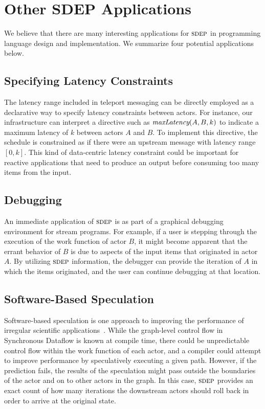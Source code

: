 \section{Other SDEP Applications}

We believe that there are many interesting applications for $\textsc{sdep}$ in
programming language design and implementation.  We summarize four
potential applications below.

\subsection{Specifying Latency Constraints}

The latency range included in teleport messaging can be directly
employed as a declarative way to specify latency constraints between
actors.  For instance, our infrastructure can interpret a directive
such as $\mbox{\it maxLatency}(A, B, k)$ to indicate a maximum latency of
$k$ between actors $A$ and $B$.  To implement this directive, the
schedule is constrained as if there were an upstream message with
latency range $[0,k]$.  This kind of data-centric latency constraint
could be important for reactive applications that need to produce an
output before consuming too many items from the input.

\subsection{Debugging}

An immediate application of $\textsc{sdep}$ is as part of a graphical
debugging environment for stream programs.  For example, if a user is
stepping through the execution of the work function of actor $B$, it
might become apparent that the errant behavior of $B$ is due to
aspects of the input items that originated in actor $A$.  By utilizing
$\textsc{sdep}$ information, the debugger can provide the iteration of $A$ in
which the items originated, and the user can continue debugging at
that location.

\subsection{Software-Based Speculation}

Software-based speculation is one approach to improving the
performance of irregular scientific applications~\cite{frank-thesis}.
While the graph-level control flow in Synchronous Dataflow is known at
compile time, there could be unpredictable control flow within the
work function of each actor, and a compiler could attempt to improve
performance by speculatively executing a given path.  However, if the
prediction fails, the results of the speculation might pass outside
the boundaries of the actor and on to other actors in the graph.  In
this case, $\textsc{sdep}$ provides an exact count of how many iterations the
downstream actors should roll back in order to arrive at the original
state.

